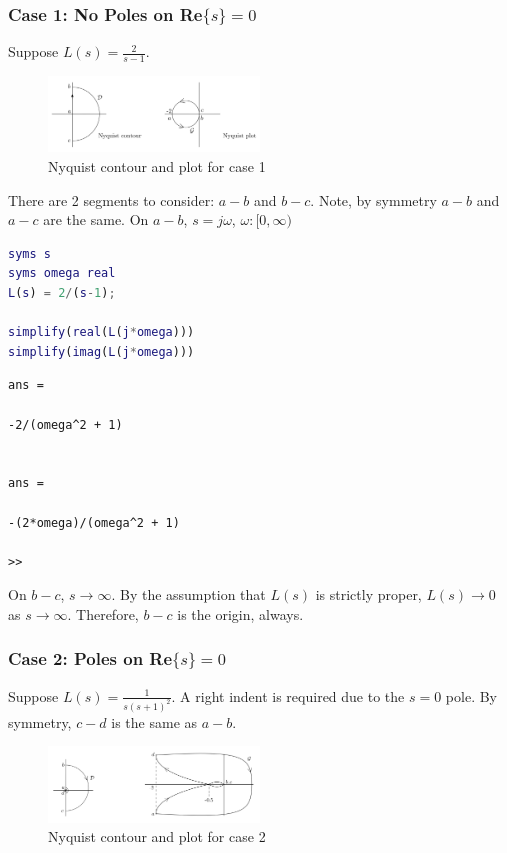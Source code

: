 \documentclass[letterpaper,12pt]{article}
\begin{document}
\subsubsection{Case 1: No Poles on Re$\{s\} = 0$}
Suppose $L(s) = \frac{2}{s-1}$.
\begin{figure}[h]
    \centering
    \includegraphics[width=0.5\textwidth]{case1 nyquist plots.png}
    \caption{Nyquist contour and plot for case 1}
\end{figure}
There are 2 segments to consider: $a-b$ and $b-c$. Note, by symmetry $a-b$ and $a-c$ are the same. On $a-b$, $s= j\omega$, $\omega: [0, \infty)$ 
\begin{lstlisting}[language=Matlab]
syms s 
syms omega real
L(s) = 2/(s-1);

simplify(real(L(j*omega)))
simplify(imag(L(j*omega)))
\end{lstlisting}
\begin{verbatim}
ans =
 
-2/(omega^2 + 1)
 
 
ans =
 
-(2*omega)/(omega^2 + 1)
 
>> 
\end{verbatim}
On $b-c$, $s \to \infty$. By the assumption that $L(s)$ is strictly proper, $L(s) \to 0$ as $s \to \infty$. Therefore, $b-c$ is the origin, always.

\subsubsection{Case 2: Poles on Re$\{s\} = 0$}
Suppose $L(s) = \frac{1}{s(s+1)^2}$. A right indent is required due to the $s=0$ pole. By symmetry, $c-d$ is the same as $a-b$.

\begin{figure}[h]
    \centering
    \includegraphics[width=0.5\textwidth]{case2 nyquist plots.png}
    \caption{Nyquist contour and plot for case 2}
\end{figure}
\end{document}
